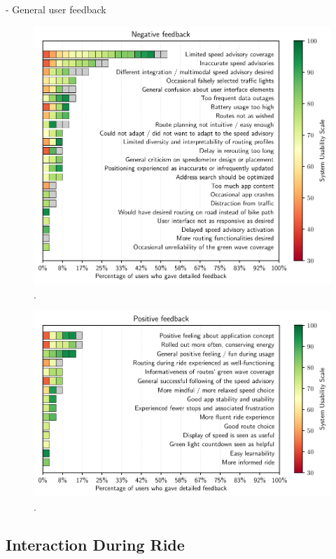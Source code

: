 - General user feedback

\begin{figure}[t]
\caption{.}\label{fig:}
\includegraphics[width=\linewidth]{images/app-feedback-negative.pdf}
\end{figure}

\begin{figure}[t]
\caption{.}\label{fig:}
\includegraphics[width=\linewidth]{images/app-feedback-positive.pdf}
\end{figure}


\subsection{Interaction During Ride}

